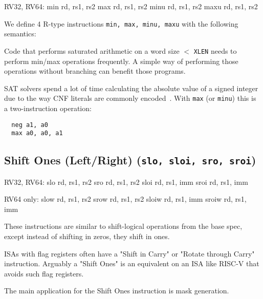 \begin{rvb}
  RV32, RV64:
    min rd, rs1, rs2
    max rd, rs1, rs2
    minu rd, rs1, rs2
    maxu rd, rs1, rs2
\end{rvb}

We define 4 R-type instructions \texttt{min, max, minu, maxu} with the
following semantics:



Code that performs saturated arithmetic on a word size $<$ \texttt{XLEN} needs to perform
min/max operations frequently. A simple way of performing those operations without branching
can benefit those programs.

SAT solvers spend a lot of time calculating the absolute value of a signed
integer due to the way CNF literals are commonly encoded~\cite{BiereComm}. With
\texttt{max} (or \texttt{minu}) this is a two-instruction operation:

\begin{minipage}{\linewidth}
\begin{verbatim}
  neg a1, a0
  max a0, a0, a1
\end{verbatim}
\end{minipage}


\subsection{Shift Ones (Left/Right) (\texttt{slo,\ sloi,\ sro,\ sroi})}

\begin{rvb}
  RV32, RV64:
    slo  rd, rs1, rs2
    sro  rd, rs1, rs2
    sloi rd, rs1, imm
    sroi rd, rs1, imm

  RV64 only:
    slow  rd, rs1, rs2
    srow  rd, rs1, rs2
    sloiw rd, rs1, imm
    sroiw rd, rs1, imm
\end{rvb}

These instructions are similar to shift-logical operations from the base
spec, except instead of shifting in zeros, they shift in ones.



ISAs with flag registers often have a "Shift in Carry" or "Rotate through Carry" instruction.
Arguably a "Shift Ones" is an equivalent on an ISA like RISC-V that avoids such flag registers.

The main application for the Shift Ones instruction is mask generation.

